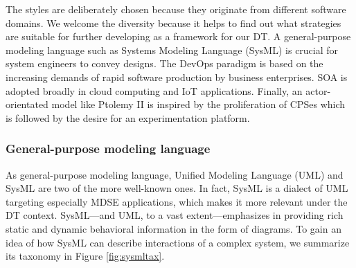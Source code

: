 The styles are deliberately chosen because they originate from different software domains. We welcome the diversity because it helps to find out what strategies are suitable for further developing as a framework for our DT. A general-purpose modeling language such as Systems Modeling Language (SysML) \cite{sysml} is crucial for system engineers to convey designs. The DevOps paradigm is based on the increasing demands of rapid software production by business enterprises. SOA is adopted broadly in cloud computing and IoT applications. Finally, an actor-orientated model like Ptolemy II \cite{ptolemy} is inspired by the proliferation of CPSes which is followed by the desire for an experimentation platform.

\subsubsection{General-purpose modeling language}

As general-purpose modeling language, Unified Modeling Language (UML) and SysML are two of the more well-known ones. In fact, SysML is a dialect of UML targeting especially MDSE applications, which makes it more relevant under the DT context. SysML---and UML, to a vast extent---emphasizes in providing rich static and dynamic behavioral information in the form of diagrams. To gain an idea of how SysML can describe interactions of a complex system, we summarize its taxonomy in Figure \ref{fig:sysmltax}.

